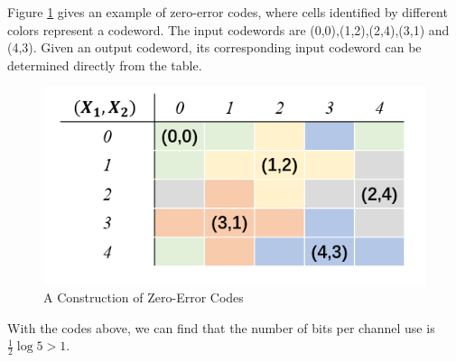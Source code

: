\begin{exercise}
\begin{solution}
\begin{enumerate}
{      Figure \ref{fig:ex6-8} gives an example of zero-error codes, where cells identified by different colors represent a codeword. The input codewords are (0,0),(1,2),(2,4),(3,1) and (4,3). Given an output codeword, its corresponding input codeword can be determined directly from the table.
      \begin{figure}[H]
        \centering
        \includegraphics[]{img/6-6.png}
        \caption{A Construction of Zero-Error Codes}
        \label{fig:ex6-8}
      \end{figure}

      With the codes above, we can find that the number of bits per channel use is $\frac{1}{2} \log{5} > 1$.
    }
  \end{enumerate}
  \end{solution}
  \label{ex6-8}
\end{exercise}